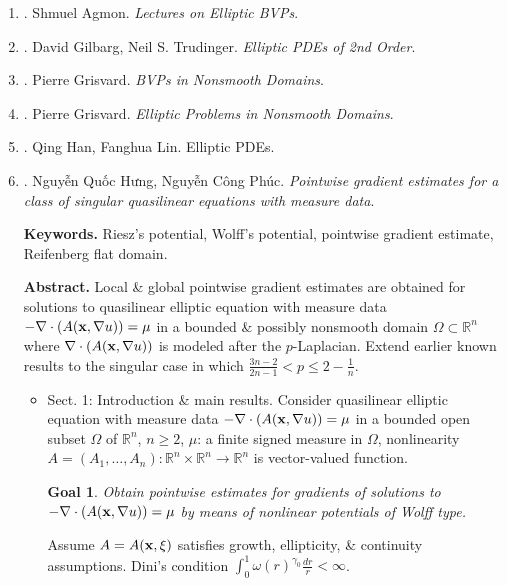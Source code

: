 \documentclass{article}
\newtheorem{goal}{Goal}
\begin{document}
\begin{enumerate}
	\item \cite{Agmon1965,Agmon2010}. {\sc Shmuel Agmon}. {\it Lectures on Elliptic BVPs}.
	\item \cite{Gilbarg_Trudinger2001}. {\sc David Gilbarg, Neil S. Trudinger}. {\it Elliptic PDEs of 2nd Order}.
	\item \cite{Grisvard1980}. {\sc Pierre Grisvard}. {\it BVPs in Nonsmooth Domains}.
	\item \cite{Grisvard1985,Grisvard2011}. {\sc Pierre Grisvard}. {\it Elliptic Problems in Nonsmooth Domains}.
	\item \cite{Han_Lin2011}. {\sc Qing Han, Fanghua Lin}. {\sc Elliptic PDEs}.
	\item \cite{Hung_Phuc2020}. {\sc Nguyễn Quốc Hưng, Nguyễn Công Phúc}. {\it Pointwise gradient estimates for a class of singular quasilinear equations with measure data}.
	
	{\bf Keywords.} Riesz's potential, Wolff's potential, pointwise gradient estimate, Reifenberg flat domain.
	
	{\bf Abstract.} Local \& global pointwise gradient estimates are obtained for solutions to quasilinear elliptic equation with measure data $-\nabla\cdot(A({\bf x},\nabla u)) = \mu$ in a bounded \& possibly nonsmooth domain $\Omega\subset\mathbb{R}^n$ where $\nabla\cdot(A({\bf x},\nabla u))$ is modeled after the $p$-Laplacian. Extend earlier known results to the singular case in which $\frac{3n - 2}{2n - 1} < p\le2 - \frac{1}{n}$.
	
	\begin{itemize}
		\item {\sf Sect. 1: Introduction \& main results.} Consider quasilinear elliptic equation with measure data $-\nabla\cdot(A({\bf x},\nabla u)) = \mu$ in a bounded open subset $\Omega$ of $\mathbb{R}^n$, $n\ge2$, $\mu$: a finite signed measure in $\Omega$, nonlinearity $A = (A_1,\ldots,A_n):\mathbb{R}^n\times\mathbb{R}^n\to\mathbb{R}^n$ is vector-valued function.
		
		\begin{goal}
			Obtain pointwise estimates for gradients of solutions to $-\nabla\cdot(A({\bf x},\nabla u)) = \mu$ by means of nonlinear potentials of Wolff type.
		\end{goal}
		Assume $A = A({\bf x},\xi)$ satisfies growth, ellipticity, \& continuity assumptions. Dini's condition $\int_0^1 \omega(r)^{\gamma_0}\frac{dr}{r} < \infty$.
		

\end{itemize}
\end{enumerate}
\end{document}
